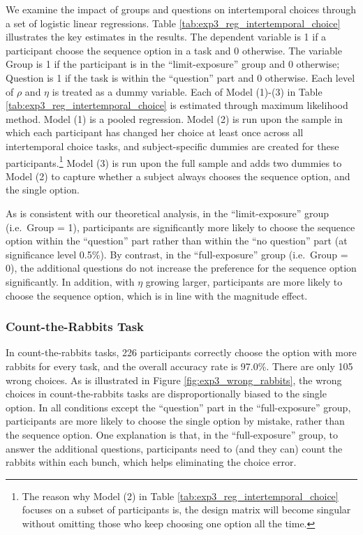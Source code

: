 \documentclass[
  12pt,
]{article}
\begin{document}
We examine the impact of groups and questions on intertemporal choices
through a set of logistic linear regressions. Table
\ref{tab:exp3_reg_intertemporal_choice} illustrates the key estimates in
the results. The dependent variable is 1 if a participant choose the
sequence option in a task and 0 otherwise. The variable Group is 1 if
the participant is in the ``limit-exposure'' group and 0 otherwise;
Question is 1 if the task is within the ``question'' part and 0
otherwise. Each level of \(\rho\) and \(\eta\) is treated as a dummy
variable. Each of Model (1)-(3) in Table
\ref{tab:exp3_reg_intertemporal_choice} is estimated through maximum
likelihood method. Model (1) is a pooled regression. Model (2) is run
upon the sample in which each participant has changed her choice at
least once across all intertemporal choice tasks, and subject-specific
dummies are created for these participants.\footnote{The reason why
  Model (2) in Table \ref{tab:exp3_reg_intertemporal_choice} focuses on
  a subset of participants is, the design matrix will become singular
  without omitting those who keep choosing one option all the time.}
Model (3) is run upon the full sample and adds two dummies to Model (2)
to capture whether a subject always chooses the sequence option, and the
single option.



As is consistent with our theoretical analysis, in the
``limit-exposure'' group (i.e.~Group = 1), participants are
significantly more likely to choose the sequence option within the
``question'' part rather than within the ``no question'' part (at
significance level 0.5\%). By contrast, in the ``full-exposure'' group
(i.e.~Group = 0), the additional questions do not increase the
preference for the sequence option significantly. In addition, with
\(\eta\) growing larger, participants are more likely to choose the
sequence option, which is in line with the magnitude effect.

\hypertarget{count-the-rabbits-task}{%
\subsubsection{Count-the-Rabbits Task}\label{count-the-rabbits-task}}

In count-the-rabbits tasks, 226 participants correctly choose the option
with more rabbits for every task, and the overall accuracy rate is
97.0\%. There are only 105 wrong choices. As is illustrated in Figure
\ref{fig:exp3_wrong_rabbits}, the wrong choices in count-the-rabbits
tasks are disproportionally biased to the single option. In all
conditions except the ``question'' part in the ``full-exposure'' group,
participants are more likely to choose the single option by mistake,
rather than the sequence option. One explanation is that, in the
``full-exposure'' group, to answer the additional questions,
participants need to (and they can) count the rabbits within each bunch,
which helps eliminating the choice error.
\end{document}
